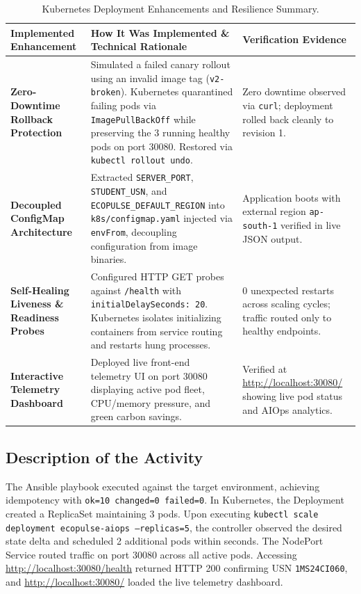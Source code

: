 \documentclass[12pt,a4paper]{article}
\begin{document}
\begin{table}[H]
\centering
\small
\renewcommand{\arraystretch}{1.3}
\begin{tabular}{|p{3.5cm}|p{6.5cm}|p{4.5cm}|}
\hline
\textbf{Implemented Enhancement} & \textbf{How It Was Implemented \& Technical Rationale} & \textbf{Verification Evidence} \\
\hline
\textbf{Zero-Downtime Rollback Protection} & Simulated a failed canary rollout using an invalid image tag (\texttt{v2-broken}). Kubernetes quarantined failing pods via \texttt{ImagePullBackOff} while preserving the 3 running healthy pods on port 30080. Restored via \texttt{kubectl rollout undo}. & Zero downtime observed via \texttt{curl}; deployment rolled back cleanly to revision 1. \\
\hline
\textbf{Decoupled ConfigMap Architecture} & Extracted \texttt{SERVER\_PORT}, \texttt{STUDENT\_USN}, and \texttt{ECOPULSE\_DEFAULT\_REGION} into \texttt{k8s/configmap.yaml} injected via \texttt{envFrom}, decoupling configuration from image binaries. & Application boots with external region \texttt{ap-south-1} verified in live JSON output. \\
\hline
\textbf{Self-Healing Liveness \& Readiness Probes} & Configured HTTP GET probes against \texttt{/health} with \texttt{initialDelaySeconds: 20}. Kubernetes isolates initializing containers from service routing and restarts hung processes. & 0 unexpected restarts across scaling cycles; traffic routed only to healthy endpoints. \\
\hline
\textbf{Interactive Telemetry Dashboard} & Deployed live front-end telemetry UI on port 30080 displaying active pod fleet, CPU/memory pressure, and green carbon savings. & Verified at \url{http://localhost:30080/} showing live pod status and AIOps analytics. \\
\hline
\end{tabular}
\caption{Kubernetes Deployment Enhancements and Resilience Summary.}
\end{table}

\subsection*{Description of the Activity}
The Ansible playbook executed against the target environment, achieving idempotency with \texttt{ok=10 changed=0 failed=0}. In Kubernetes, the Deployment created a ReplicaSet maintaining 3 pods. Upon executing \texttt{kubectl scale deployment ecopulse-aiops --replicas=5}, the controller observed the desired state delta and scheduled 2 additional pods within seconds. The NodePort Service routed traffic on port 30080 across all active pods. Accessing \url{http://localhost:30080/health} returned HTTP 200 confirming USN \texttt{1MS24CI060}, and \url{http://localhost:30080/} loaded the live telemetry dashboard.
\end{document}
